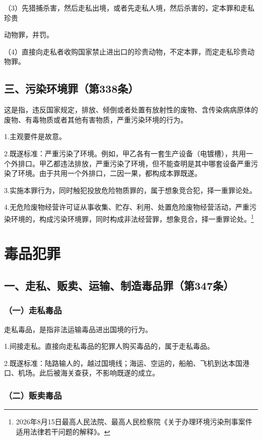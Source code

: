 （3）先猎捕杀害，然后走私出境，或者先走私人境，然后杀害的，定本罪和走私珍贵

动物罪，并罚。

（4）直接向走私者收购国家禁止进出口的珍贵动物，不定本罪，而定走私珍贵动物罪。

\subsection*{三、污染环境罪（第338条）}

这是指，违反国家规定，排放、倾倒或者处置有放射性的废物、含传染病病原体的废物、有毒物质或者其他有害物质，严重污染环境的行为。

1.主观要件是故意。

2.既遂标准：严重污染了环境。例如，甲乙各有一套生产设备（电镀槽），共用一个外排口。甲乙都违法排放，严重污染了环境，但不能查明是其中哪套设备严重污染了环境。由于共用一个外排口，二因一果，都构成本罪既遂。

3.实施本罪行为，同时触犯投放危险物质罪的，属于想象竞合犯，择一重罪论处。

4.无危险废物经营许可证从事收集、贮存、利用、处置危险废物经营活动，严重污染环境的，构成污染环境罪，同时构成非法经营罪，想象竞合，择一重罪论处。\footnote{2026年8月15日最高人民法院、最高人民检察院《关于办理环境污染刑事案件适用法律若干问题的解释》。}

\section{毒品犯罪}

\subsection*{一、走私、贩卖、运输、制造毒品罪（第347条）}

\subsubsection*{（一）走私毒品}

走私毒品，是指非法运输毒品进出国境的行为。

1.间接走私。直接向走私毒品的犯罪人购买毒品的，属于走私毒品。

2.既遂标准：陆路输人的，越过国境线；海运、空运的，船舶、飞机到达本国港口、机场。此后被海关查获，不影响既遂的成立。

\subsubsection*{（二）贩卖毒品}

